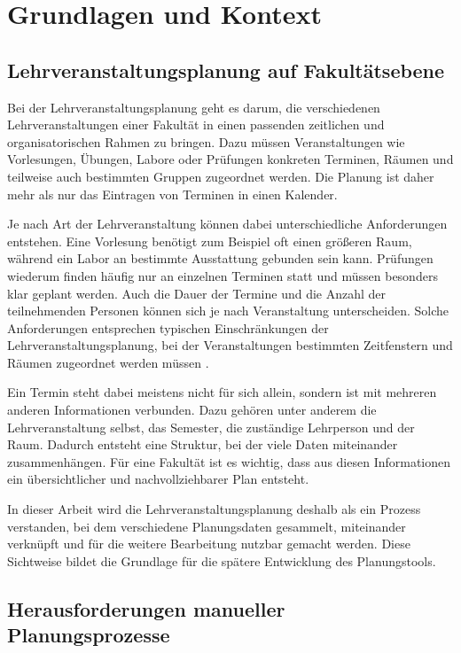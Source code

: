 \documentclass[12pt,a4paper]{article}
\begin{document}
\section{Grundlagen und Kontext}

\subsection{Lehrveranstaltungsplanung auf Fakultätsebene}

Bei der Lehrveranstaltungsplanung geht es darum, die verschiedenen Lehrveranstaltungen einer Fakultät in einen passenden zeitlichen und organisatorischen Rahmen zu bringen. Dazu müssen Veranstaltungen wie Vorlesungen, Übungen, Labore oder Prüfungen konkreten Terminen, Räumen und teilweise auch bestimmten Gruppen zugeordnet werden. Die Planung ist daher mehr als nur das Eintragen von Terminen in einen Kalender.

Je nach Art der Lehrveranstaltung können dabei unterschiedliche Anforderungen entstehen. Eine Vorlesung benötigt zum Beispiel oft einen größeren Raum, während ein Labor an bestimmte Ausstattung gebunden sein kann. Prüfungen wiederum finden häufig nur an einzelnen Terminen statt und müssen besonders klar geplant werden. Auch die Dauer der Termine und die Anzahl der teilnehmenden Personen können sich je nach Veranstaltung unterscheiden. Solche Anforderungen entsprechen typischen Einschränkungen der Lehrveranstaltungsplanung, bei der Veranstaltungen bestimmten Zeitfenstern und Räumen zugeordnet werden müssen \cite{babaei2015survey}.

Ein Termin steht dabei meistens nicht für sich allein, sondern ist mit mehreren anderen Informationen verbunden. Dazu gehören unter anderem die Lehrveranstaltung selbst, das Semester, die zuständige Lehrperson und der Raum. Dadurch entsteht eine Struktur, bei der viele Daten miteinander zusammenhängen.
Für eine Fakultät ist es wichtig, dass aus diesen Informationen ein übersichtlicher und nachvollziehbarer Plan entsteht.

In dieser Arbeit wird die Lehrveranstaltungsplanung deshalb als ein Prozess verstanden, bei dem verschiedene Planungsdaten gesammelt, miteinander verknüpft und für die weitere Bearbeitung nutzbar gemacht werden. Diese Sichtweise bildet die Grundlage für die spätere Entwicklung des Planungstools.

\subsection{Herausforderungen manueller Planungsprozesse}
\end{document}
